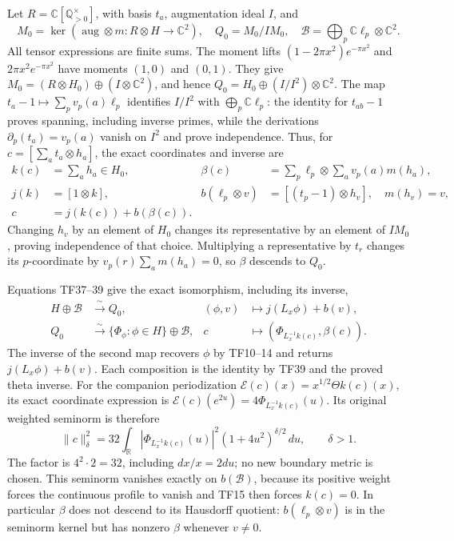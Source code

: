 \documentclass[
  10pt,
  a4paper,
]{article}
\begin{document}
Let \(R=\mathbb C[\mathbb Q_{>0}^{\times}]\), with basis \(t_a\),
augmentation ideal \(I\), and \[
M_0=\ker(\operatorname{aug}\otimes m:R\otimes H\to\mathbb C^2),
\quad Q_0=M_0/IM_0,\quad
\mathcal B=\bigoplus_p\mathbb C\ell_p\otimes\mathbb C^2.
\tag{TF38}
\] All tensor expressions are finite sums. The moment lifts
\((1-2\pi x^2)e^{-\pi x^2}\) and \(2\pi x^2e^{-\pi x^2}\) have moments
\((1,0)\) and \((0,1)\). They give
\(M_0=(R\otimes H_0)\oplus(I\otimes\mathbb C^2)\), and hence
\(Q_0=H_0\oplus(I/I^2)\otimes\mathbb C^2\). The map
\(t_a-1\mapsto\sum_pv_p(a)\ell_p\) identifies \(I/I^2\) with
\(\bigoplus_p\mathbb C\ell_p\): the identity for \(t_{ab}-1\) proves
spanning, including inverse primes, while the derivations
\(\partial_p(t_a)=v_p(a)\) vanish on \(I^2\) and prove independence.
Thus, for \(c=[\sum_a t_a\otimes h_a]\), the exact coordinates and
inverse are \[
\begin{aligned}
k(c)&=\sum_a h_a\in H_0,&
\beta(c)&=\sum_p\ell_p\otimes\sum_a v_p(a)m(h_a),\\
j(k)&=[1\otimes k],&
b(\ell_p\otimes v)&=[(t_p-1)\otimes h_v],\quad m(h_v)=v,\\
c&=j(k(c))+b(\beta(c)).&&
\end{aligned}
\tag{TF39}
\] Changing \(h_v\) by an element of \(H_0\) changes its representative
by an element of \(IM_0\), proving independence of that choice.
Multiplying a representative by \(t_r\) changes its \(p\)-coordinate by
\(v_p(r)\sum_am(h_a)=0\), so \(\beta\) descends to \(Q_0\).

Equations TF37--39 give the exact isomorphism, including its inverse, \[
\begin{aligned}
H\oplus\mathcal B&\xrightarrow{\ \sim\ }Q_0,&
(\phi,v)&\longmapsto j(L_x\phi)+b(v),\\
Q_0&\xrightarrow{\ \sim\ }\{\Phi_\phi:\phi\in H\}\oplus\mathcal B,&
c&\longmapsto(\Phi_{L_x^{-1}k(c)},\beta(c)).
\end{aligned}
\tag{TF40}
\] The inverse of the second map recovers \(\phi\) by TF10--14 and
returns \(j(L_x\phi)+b(v)\). Each composition is the identity by TF39
and the proved theta inverse. For the companion periodization
\(\mathcal E(c)(x)=x^{1/2}\Theta k(c)(x)\), its exact coordinate
expression is \(\mathcal E(c)(e^{2u})=4\Phi_{L_x^{-1}k(c)}(u)\). Its
original weighted seminorm is therefore \[
\|c\|_\delta^2
=32\int_{\mathbb R}|\Phi_{L_x^{-1}k(c)}(u)|^2
(1+4u^2)^{\delta/2}\,du,\qquad\delta>1.
\tag{TF41}
\] The factor is \(4^2\cdot2=32\), including \(dx/x=2du\); no new
boundary metric is chosen. This seminorm vanishes exactly on
\(b(\mathcal B)\), because its positive weight forces the continuous
profile to vanish and TF15 then forces \(k(c)=0\). In particular
\(\beta\) does not descend to its Hausdorff quotient:
\(b(\ell_p\otimes v)\) is in the seminorm kernel but has nonzero
\(\beta\) whenever \(v\ne0\).
\end{document}
